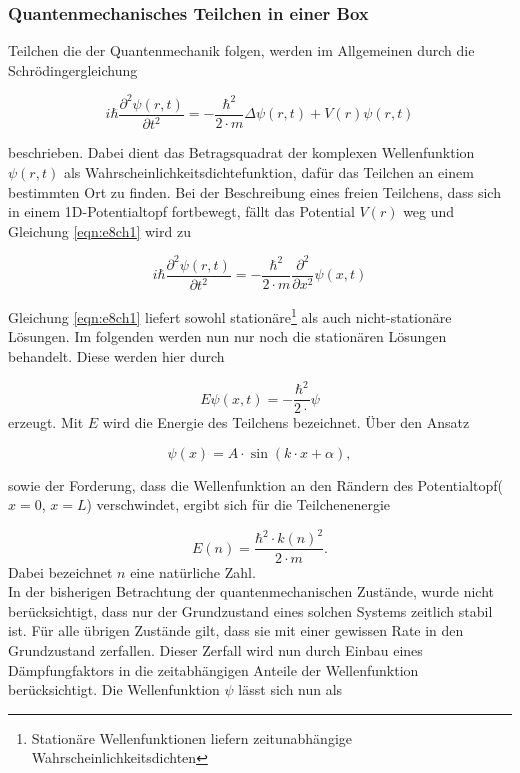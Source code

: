 \subsubsection{Quantenmechanisches Teilchen in einer Box}
\label{subsubsec:tch12}
Teilchen die der Quantenmechanik folgen, werden im Allgemeinen
durch die Schrödingergleichung


\begin{equation}
  \label{eqn:e8ch1}
  i \hbar \frac{\partial ^2 \psi(r,t)}{\partial  t^2} = -\frac{\hbar^2}{2\cdot m} \Delta  \psi(r,t) + V(r) \psi(r,t)
\end{equation}

beschrieben.
Dabei dient das Betragsquadrat der komplexen Wellenfunktion $\psi(r,t)$
als Wahrscheinlichkeitsdichtefunktion, dafür das Teilchen an
einem bestimmten Ort zu finden.
Bei der Beschreibung eines freien Teilchens, dass sich in einem
1D-Potentialtopf fortbewegt, fällt das Potential $V(r)$
weg und Gleichung \eqref{eqn:e8ch1} wird zu


\begin{equation}
  \label{eqn:e9ch1}
  i \hbar \frac{\partial ^2 \psi(r,t)}{\partial  t^2} = -\frac{\hbar^2}{2\cdot m}
  \frac{\partial ^2}{\partial  x^2} \psi(x, t)
\end{equation}

Gleichung \eqref{eqn:e8ch1} liefert sowohl stationäre\footnote{Stationäre
Wellenfunktionen liefern zeitunabhängige Wahrscheinlichkeitsdichten}
als auch nicht-stationäre Lösungen. Im folgenden werden
nun nur noch die stationären Lösungen behandelt.
Diese werden hier durch


\begin{equation}
  \label{e10ch1}
  E \psi(x,t) = - \frac{\hbar^2}{2 \cdot} \psi
\end{equation}
erzeugt. Mit $E$ wird die Energie des Teilchens bezeichnet.
Über den Ansatz


\begin{equation}
  \label{eqn:e11ch1}
  \psi(x) = A \cdot \sin\left( k \cdot x + \alpha \right),
\end{equation}

sowie der Forderung, dass die Wellenfunktion an den Rändern des
Potentialtopf($x = 0$, $x = L$) verschwindet, ergibt sich
für die Teilchenenergie


\begin{equation}
  \label{eqn:e12ch1}
  E(n) = \frac{\hbar^2 \cdot k(n)^2}{2\cdot m}.
\end{equation}
Dabei bezeichnet $n$ eine natürliche Zahl.\\
In der bisherigen Betrachtung der quantenmechanischen Zustände, wurde nicht berücksichtigt, dass
nur der Grundzustand eines solchen Systems zeitlich stabil ist. Für alle übrigen Zustände gilt, dass
sie mit einer gewissen Rate in den Grundzustand zerfallen. Dieser Zerfall wird nun durch Einbau eines Dämpfungfaktors
in die zeitabhängigen Anteile der Wellenfunktion berücksichtigt. Die Wellenfunktion $\psi$ lässt sich nun als


